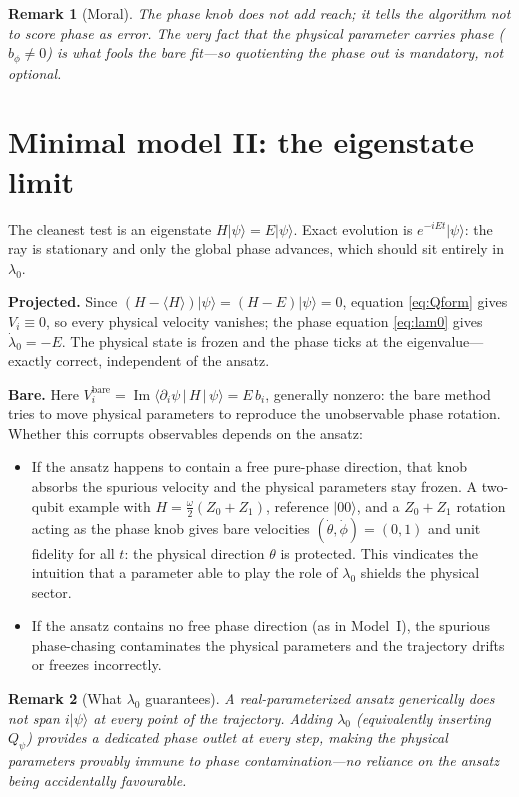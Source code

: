\documentclass[12pt,a4paper]{article}
\newcommand{\ket}[1]{\lvert #1 \rangle}
\newcommand{\mel}[3]{\langle #1 \,|\, #2 \,|\, #3 \rangle}
\newcommand{\im}{\operatorname{Im}}
\newtheorem{remark}{Remark}[section]
\begin{document}
\begin{remark}[Moral]
The phase knob does not add reach; it tells the algorithm not to score phase as error. The very fact
that the physical parameter carries phase ($b_\phi\neq0$) is what fools the bare fit---so quotienting
the phase out is mandatory, not optional.
\end{remark}

\section{Minimal model II: the eigenstate limit}\label{sec:ex2}

The cleanest test is an eigenstate $H\ket{\psi}=E\ket{\psi}$. Exact evolution is
$e^{-iEt}\ket{\psi}$: the ray is stationary and only the global phase advances, which should sit
entirely in $\lambda_0$.

\textbf{Projected.} Since $(H-\langle H\rangle)\ket{\psi}=(H-E)\ket{\psi}=0$, equation
\eqref{eq:Qform} gives $V_i\equiv0$, so every physical velocity vanishes; the phase equation
\eqref{eq:lam0} gives $\dot\lambda_0=-E$. The physical state is frozen and the phase ticks at the
eigenvalue---exactly correct, independent of the ansatz.

\textbf{Bare.} Here $V_i^{\text{bare}}=\im\mel{\partial_i\psi}{H}{\psi}=E\,b_i$, generally nonzero:
the bare method tries to move physical parameters to reproduce the unobservable phase rotation. Whether
this corrupts observables depends on the ansatz:
\begin{itemize}[leftmargin=1.4em]
  \item If the ansatz happens to contain a free pure-phase direction, that knob absorbs the spurious
  velocity and the physical parameters stay frozen. A two-qubit example with $H=\tfrac{\omega}{2}(Z_0+Z_1)$,
  reference $\ket{00}$, and a $Z_0+Z_1$ rotation acting as the phase knob gives bare velocities
  $(\dot\theta,\dot\phi)=(0,1)$ and unit fidelity for all $t$: the physical direction $\theta$ is
  protected. This vindicates the intuition that a parameter able to play the role of $\lambda_0$
  shields the physical sector.
  \item If the ansatz contains no free phase direction (as in Model~I), the spurious phase-chasing
  contaminates the physical parameters and the trajectory drifts or freezes incorrectly.
\end{itemize}

\begin{remark}[What $\lambda_0$ guarantees]
A real-parameterized ansatz generically does \emph{not} span $i\ket{\psi}$ at every point of the
trajectory. Adding $\lambda_0$ (equivalently inserting $Q_\psi$) provides a dedicated phase outlet at
every step, making the physical parameters provably immune to phase contamination---no reliance on the
ansatz being accidentally favourable.
\end{remark}
\end{document}
